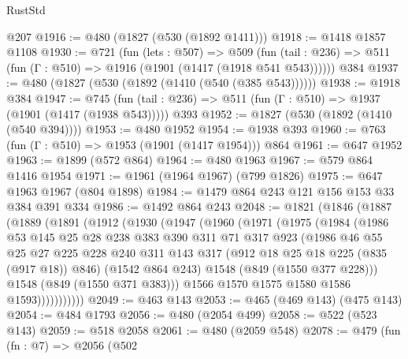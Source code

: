 \begin{lexlean}{RustStd}
\begin{coremodule}
    @207
@1916 := @480 (@1827 (@530 (@1892 @1411)))
@1918 := @1418 @1857 @1108
@1930 := @721
    (fun (lets : @507) =>
    @509 (fun (tail : @236) => @511 (fun (Γ : @510) => @1916 (@1901 (@1417 (@1918 @541 @543))))))
    @384
@1937 := @480 (@1827 (@530 (@1892 (@1410 (@540 (@385 @543))))))
@1938 := @1918 @384
@1947 := @745
    (fun (tail : @236) => @511 (fun (Γ : @510) => @1937 (@1901 (@1417 (@1938 @543)))))
    @393
@1952 := @1827 (@530 (@1892 (@1410 (@540 @394))))
@1953 := @480 @1952
@1954 := @1938 @393
@1960 := @763 (fun (Γ : @510) => @1953 (@1901 (@1417 @1954))) @864
@1961 := @647 @1952
@1963 := @1899 (@572 @864)
@1964 := @480 @1963
@1967 := @579 @864 @1416 @1954
@1971 := @1961 (@1964 @1967) (@799 @1826)
@1975 := @647 @1963 @1967 (@804 @1898)
@1984 := @1479 @864 @243 @121 @156 @153 @33 @384 @391 @334
@1986 := @1492 @864 @243
@2048 := @1821
    (@1846
      (@1887
        (@1889
          (@1891
            (@1912
              (@1930
                (@1947
                  (@1960
                    (@1971
                      (@1975
                        (@1984
                          (@1986
                            @53
                            @145
                            @25
                            @28
                            @238
                            @383
                            @390
                            @311
                            @71
                            @317
                            @923
                            (@1986
                              @46
                              @55
                              @25
                              @27
                              @225
                              @228
                              @240
                              @311
                              @143
                              @317
                              (@912 @18 @25 @18 @225 (@835 (@917 @18)) @846)
                              (@1542 @864 @243)
                              @1548
                              (@849 (@1550 @377 @228)))
                            @1548
                            (@849 (@1550 @371 @383)))
                          @1566
                          @1570
                          @1575
                          @1580
                          @1586
                          @1593)))))))))))
@2049 := @463 @143
@2053 := @465 (@469 @143) (@475 @143)
@2054 := @484 @1793
@2056 := @480 (@2054 @499)
@2058 := @522 (@523 @143)
@2059 := @518 @2058
@2061 := @480 (@2059 @548)
@2078 := @479
    (fun (fn : @7) =>
    @2056
      (@502

\end{coremodule}
\end{lexlean}
